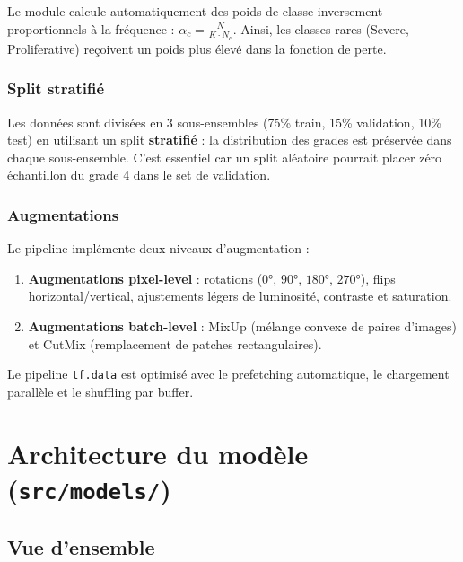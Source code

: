 ﻿\documentclass[11pt,a4paper]{article}
\begin{document}
Le module calcule automatiquement des poids de classe inversement proportionnels à la fréquence : $\alpha_c = \frac{N}{K \cdot N_c}$. Ainsi, les classes rares (Severe, Proliferative) reçoivent un poids plus élevé dans la fonction de perte.

\subsubsection{Split stratifié}

Les données sont divisées en 3 sous-ensembles (75\% train, 15\% validation, 10\% test) en utilisant un split \textbf{stratifié} : la distribution des grades est préservée dans chaque sous-ensemble. C'est essentiel car un split aléatoire pourrait placer zéro échantillon du grade 4 dans le set de validation.

\subsubsection{Augmentations}

Le pipeline implémente deux niveaux d'augmentation :

\begin{enumerate}[leftmargin=2em]
  \item \textbf{Augmentations pixel-level} : rotations ($0°$, $90°$, $180°$, $270°$), flips horizontal/vertical, ajustements légers de luminosité, contraste et saturation.
  \item \textbf{Augmentations batch-level} : MixUp (mélange convexe de paires d'images) et CutMix (remplacement de patches rectangulaires).
\end{enumerate}

Le pipeline \texttt{tf.data} est optimisé avec le prefetching automatique, le chargement parallèle et le shuffling par buffer.

\section{Architecture du modèle (\texttt{src/models/})}

\subsection{Vue d'ensemble}
\end{document}
